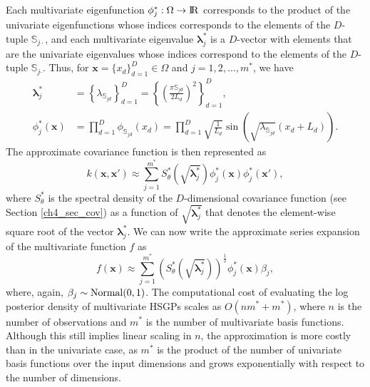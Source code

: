 Each multivariate eigenfunction $\phi^{\ast}_j:\Omega \rightarrow {\rm I\!R}$ corresponds to the product of the univariate eigenfunctions whose indices corresponds to the elements of the $D$-tuple $\mathbb{S}_{j\cdotp}$, and each multivariate eigenvalue $\bm{\lambda}^{\ast}_j$ is a $D$-vector with elements that are the univariate eigenvalues whose indices correspond to the elements of the $D$-tuple $\mathbb{S}_{j\bm{\cdotp}}$. Thus, for $\bm{x}=\{x_d\}_{d=1}^D \in \Omega$ and $j=1,2,\ldots,m^{\ast}$, we have 
%
\begin{align}
\bm{\lambda}^{\ast}_j &= \left\{ \lambda_{\mathbb{S}_{jd}} \right\}_{d=1}^D =  \left\{ \left(\frac{\pi \mathbb{S}_{jd}}{2L_d}\right)^{\!2} \right\}_{d=1}^D, \label{eq_eigenvalue_multi} \\
%
\phi^{\ast}_j(\bm{x}) &= \prod_{d=1}^{D} \phi_{\mathbb{S}_{jd}}(x_d) = \prod_{d=1}^{D} \sqrt{\frac{1}{L_d}} \sin\!\left(\sqrt{\lambda_{\mathbb{S}_{jd}}}(x_d+L_d)\right). \label{eq_eigenfunction_multi}
\end{align}
%
The approximate covariance function is then represented as
%
\begin{equation}\label{eq_approxcov_multi}
k(\bm{x},\bm{x}') \approx \sum_{j=1}^{m^{\ast}} 
S^{\ast}_{\theta}\left(\sqrt{\bm{\lambda}^{\ast}_j}\right)
\phi^{\ast}_j(\bm{x}) \phi^{\ast}_j(\bm{x}'),
\end{equation}
%
where $S^{\ast}_{\theta}$ is the spectral density of the $D$-dimensional covariance function (see Section \ref{ch4_sec_cov}) as a function of $\sqrt{\bm{\lambda}^{\ast}_j}$ that denotes the element-wise square root of the vector $\bm{\lambda}^{\ast}_j$. We can now write the approximate series expansion of the multivariate function $f$ as
%
\begin{equation}\label{eq_approxf_multi}
f(\bm{x}) \approx \sum_{j=1}^{m^{\ast}} 
\left( S^{\ast}_{\theta} \left(\sqrt{\bm{\lambda}^{\ast}_j} \right)\right)^{\! \frac{1}{2}} \phi^{\ast}_j(\bm{x}) \beta_j, 
\end{equation}
%
where, again, $\beta_j \sim \operatorname{Normal}(0,1)$. The computational cost of evaluating the log posterior density of multivariate HSGPs scales as $O(n m^{\ast} + m^{\ast})$, where $n$ is the number of observations and $m^{\ast}$ is the number of multivariate basis functions. Although this still implies linear scaling in $n$, the approximation is more costly than in the univariate case, as $m^{\ast}$ is the product of the number of univariate basis functions over the input dimensions and grows exponentially with respect to the number of  dimensions.

